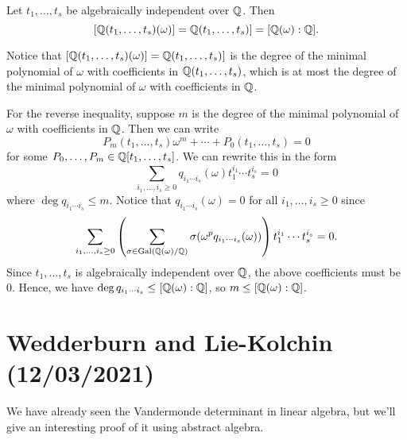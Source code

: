 \begin{lemma}{}
    Let $t_1, \dots, t_s$ be algebraically independent over $\mathbb{Q}$. Then 
    \[ [\mathbb{Q}(t_1, \dots, t_s)(\omega)] = \mathbb{Q}(t_1, \dots, t_s)] = 
    [\mathbb{Q}(\omega) : \mathbb{Q}]. \] 
\end{lemma}
\begin{pf}
    Notice that $[\mathbb{Q}(t_1, \dots, t_s)(\omega)] = \mathbb{Q}(t_1, \dots, t_s)]$ 
    is the degree of the minimal polynomial of $\omega$ with coefficients 
    in $\mathbb{Q}(t_1, \dots, t_s)$, which is at most the degree of the minimal 
    polynomial of $\omega$ with coefficients in $\mathbb{Q}$. 

    For the reverse inequality, suppose $m$ is the degree of the minimal 
    polynomial of $\omega$ with coefficients in $\mathbb{Q}$. Then we can write 
    \[ P_m(t_1, \dots, t_s) \omega^m + \cdots + P_0(t_1, \dots, t_s) = 0 \] 
    for some $P_0, \dots, P_m \in \mathbb{Q}[t_1, \dots, t_s]$. We can rewrite this 
    in the form 
    \[ \sum_{i_1,\dots,i_s \geq 0} q_{i_1\cdots i_s}(\omega) t_1^{i_1} 
    \cdots t_s^{i_s} = 0 \] 
    where $\deg q_{i_1\cdots i_s} \leq m$. Notice that 
    $q_{i_1\cdots i_s}(\omega) = 0$ for all $i_1, \dots, i_s \geq 0$ since 
    \[ \sum_{i_1,\dots, i_s \geq 0} 
    \left( \sum_{\sigma \in \operatorname{Gal}(\mathbb{Q}(\omega)/\mathbb{Q})} \sigma(\omega^p 
    q_{i_1\cdots i_s}(\omega)) \right) t_1^{i_1} \cdots t_s^{i_s} = 0. \] 
    Since $t_1, \dots, t_s$ is algebraically independent over $\mathbb{Q}$, the 
    above coefficients must be $0$. Hence, we have $\deg q_{i_1\cdots i_s} \leq
    [\mathbb{Q}(\omega) : \mathbb{Q}]$, so $m \leq [\mathbb{Q}(\omega) : \mathbb{Q}]$. 
\end{pf}

\section{Wedderburn and Lie-Kolchin (12/03/2021)}
We have already seen the Vandermonde determinant in linear algebra, but we'll 
give an interesting proof of it using abstract algebra. 

